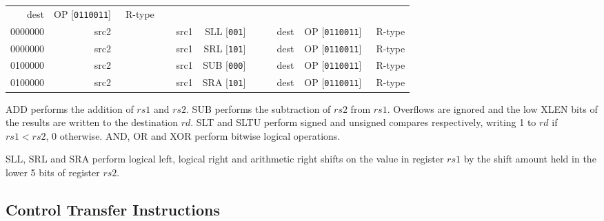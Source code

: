 \documentclass{article}
\begin{document}
\begin{table}[H]
\begin{center}
\begin{tabular}{ccccccccccccccccccccccccccccccccc}
        \multicolumn{5}{|r|}{dest} &
        \multicolumn{7}{|r|}{OP [\texttt{0110011}]} &
        \ \tiny{R-type}
        \\
        \cline{1-32}
        \multicolumn{7}{|r|}{0000000} &
        \multicolumn{5}{|r|}{src2} &
        \multicolumn{5}{|r|}{src1} &
        \multicolumn{3}{|r|}{SLL [\texttt{001}]} &
        \multicolumn{5}{|r|}{dest} &
        \multicolumn{7}{|r|}{OP [\texttt{0110011}]} &
        \ \tiny{R-type}
        \\
        \cline{1-32}
        \multicolumn{7}{|r|}{0000000} &
        \multicolumn{5}{|r|}{src2} &
        \multicolumn{5}{|r|}{src1} &
        \multicolumn{3}{|r|}{SRL [\texttt{101}]} &
        \multicolumn{5}{|r|}{dest} &
        \multicolumn{7}{|r|}{OP [\texttt{0110011}]} &
        \ \tiny{R-type}
        \\
        \cline{1-32}
        \multicolumn{7}{|r|}{0100000} &
        \multicolumn{5}{|r|}{src2} &
        \multicolumn{5}{|r|}{src1} &
        \multicolumn{3}{|r|}{SUB [\texttt{000}]} &
        \multicolumn{5}{|r|}{dest} &
        \multicolumn{7}{|r|}{OP [\texttt{0110011}]} &
        \ \tiny{R-type}
        \\
        \cline{1-32}
        \multicolumn{7}{|r|}{0100000} &
        \multicolumn{5}{|r|}{src2} &
        \multicolumn{5}{|r|}{src1} &
        \multicolumn{3}{|r|}{SRA [\texttt{101}]} &
        \multicolumn{5}{|r|}{dest} &
        \multicolumn{7}{|r|}{OP [\texttt{0110011}]} &
        \ \tiny{R-type}
        \\
        \cline{1-32}
    \end{tabular}
    \end{center}
\end{table}

ADD performs the addition of $rs1$ and $rs2$. SUB performs the subtraction of $rs2$ from $rs1$. Overflows are ignored and the low XLEN bits of the results are written to the destination $rd$. SLT and SLTU perform signed and unsigned compares respectively, writing 1 to $rd$ if $rs1<rs2$, 0 otherwise. AND, OR and XOR perform bitwise logical operations.

SLL, SRL and SRA perform logical left, logical right and arithmetic right shifts on the value in register $rs1$ by the shift amount held in the lower 5 bits of register $rs2$.

\subsection{Control Transfer Instructions}
\end{document}
